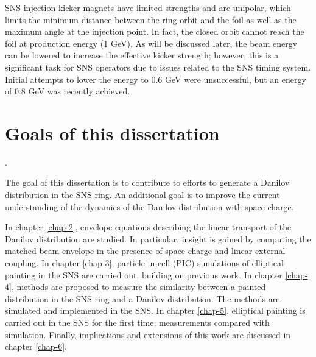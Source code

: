 SNS injection kicker magnets have limited strengths and are unipolar, which limits the minimum distance between the ring orbit and the foil as well as the maximum angle at the injection point. In fact, the closed orbit cannot reach the foil at production energy (1 GeV). As will be discussed later, the beam energy can be lowered to increase the effective kicker strength; however, this is a significant task for SNS operators due to issues related to the SNS timing system. Initial attempts to lower the energy to 0.6 GeV were unsuccessful, but an energy of 0.8 GeV was recently achieved. 



\section{Goals of this dissertation}\label{sec:Goals of this dissertation}.

The goal of this dissertation is to contribute to efforts to generate a Danilov distribution in the SNS ring. An additional goal is to improve the current understanding of the dynamics of the Danilov distribution with space charge.

In chapter \ref{chap-2}, envelope equations describing the linear transport of the Danilov distribution are studied. In particular, insight is gained by computing the matched beam envelope in the presence of space charge and linear external coupling. In chapter \ref{chap-3}, particle-in-cell (PIC) simulations of elliptical painting in the SNS are carried out, building on previous work. In chapter \ref{chap-4}, methods are proposed to measure the similarity between a painted distribution in the SNS ring and a Danilov distribution. The methods are simulated and implemented in the SNS. In chapter \ref{chap-5}, elliptical painting is carried out in the SNS for the first time; measurements compared with simulation. Finally, implications and extensions of this work are discussed in chapter \ref{chap-6}.
